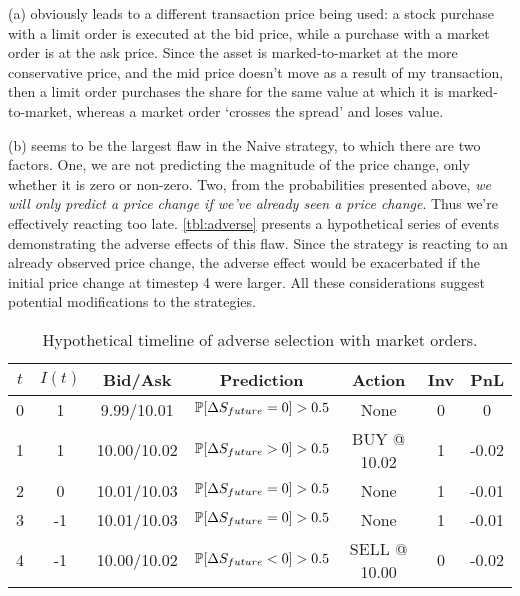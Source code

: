 (a) obviously leads to a different transaction price being used: a stock purchase with a limit order is executed at the bid price, while a purchase with a market order is at the ask price. Since the asset is marked-to-market at the more conservative price, and the mid price doesn't move as a result of my transaction, then a limit order purchases the share for the same value at which it is marked-to-market, whereas a market order `crosses the spread' and loses value.

(b) seems to be the largest flaw in the Naive strategy, to which there are two factors. One, we are not predicting the magnitude of the price change, only whether it is zero or non-zero. Two, from the probabilities presented above, \emph{we will only predict a price change if we've already seen a price change}. Thus we're effectively reacting too late. \autoref{tbl:adverse} presents a hypothetical series of events demonstrating the adverse effects of this flaw. Since the strategy is reacting to an already observed price change, the adverse effect would be exacerbated if the initial price change at timestep 4 were larger. All these considerations suggest potential modifications to the strategies.

\begin{table}
\centering
{}
\begin{tabular}{@{} *{7}{c} @{}}
\toprule
$t$ & $I(t)$ & Bid/Ask & Prediction & Action & Inv & PnL \\
\midrule
0 & 1 & \hphantom{1}9.99/10.01 & $\P[\Delta S_{future} = 0] > 0.5$ & None & 0 & 0 \\
1 & 1 & 10.00/10.02 & $\P[\Delta S_{future} > 0] > 0.5$ & BUY @ 10.02 & 1 & -0.02 \\
2 & 0 & 10.01/10.03 & $\P[\Delta S_{future} = 0] > 0.5$ & None & 1 & -0.01 \\
3 & -1 & 10.01/10.03 & $\P[\Delta S_{future} = 0] > 0.5$ & None & 1 & -0.01 \\
4 & -1 & 10.00/10.02 & $\P[\Delta S_{future} < 0] > 0.5$ & SELL @ 10.00 & 0 & -0.02 \\
\bottomrule
\end{tabular}
\caption{Hypothetical timeline of adverse selection with market orders.}
\label{tbl:adverse}
\end{table}